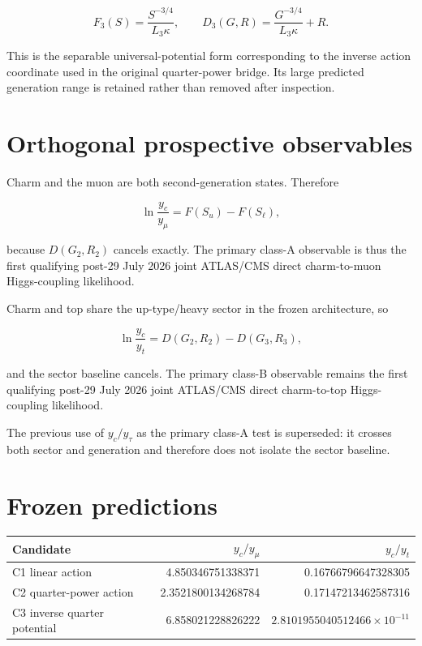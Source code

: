 \begin{equation}
F_3(S)=\frac{S^{-3/4}}{L_3\kappa},
\qquad
D_3(G,R)=\frac{G^{-3/4}}{L_3\kappa}+R.
\label{eq:v107_candidate_c3}
\end{equation}

This is the separable universal-potential form corresponding to the inverse
action coordinate used in the original quarter-power bridge.  Its large
predicted generation range is retained rather than removed after inspection.

\section{Orthogonal prospective observables}

Charm and the muon are both second-generation states.  Therefore

\begin{equation}
\ln\frac{y_c}{y_\mu}=F(S_u)-F(S_\ell),
\label{eq:v107_sector_observable}
\end{equation}

because $D(G_2,R_2)$ cancels exactly.  The primary class-A observable is thus
the first qualifying post-29 July 2026 joint ATLAS/CMS direct charm-to-muon
Higgs-coupling likelihood.

Charm and top share the up-type/heavy sector in the frozen architecture, so

\begin{equation}
\ln\frac{y_c}{y_t}=D(G_2,R_2)-D(G_3,R_3),
\label{eq:v107_generation_observable}
\end{equation}

and the sector baseline cancels.  The primary class-B observable remains the
first qualifying post-29 July 2026 joint ATLAS/CMS direct charm-to-top
Higgs-coupling likelihood.

The previous use of $y_c/y_\tau$ as the primary class-A test is superseded: it
crosses both sector and generation and therefore does not isolate the sector
baseline.

\section{Frozen predictions}

\begin{center}
\begin{tabular}{lrr}
\toprule
Candidate & $y_c/y_\mu$ & $y_c/y_t$\\
\midrule
C1 linear action & 4.850346751338371 & 0.16766796647328305\\
C2 quarter-power action & 2.3521800134268784 & 0.17147213462587316\\
C3 inverse quarter potential & 6.858021228826222 & $2.8101955040512466\times10^{-11}$\\
\bottomrule
\end{tabular}
\end{center}


